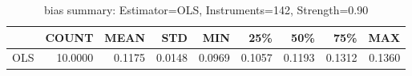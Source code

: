 \begin{table}[ht]
\centering
\caption{bias summary: Estimator=OLS, Instruments=142, Strength=0.90}
\begin{tabular}{lrrrrrrrr}
\toprule
 & COUNT & MEAN & STD & MIN & 25\% & 50\% & 75\% & MAX \\
\midrule
OLS & 10.0000 & 0.1175 & 0.0148 & 0.0969 & 0.1057 & 0.1193 & 0.1312 & 0.1360 \\
\bottomrule
\end{tabular}
\end{table}
